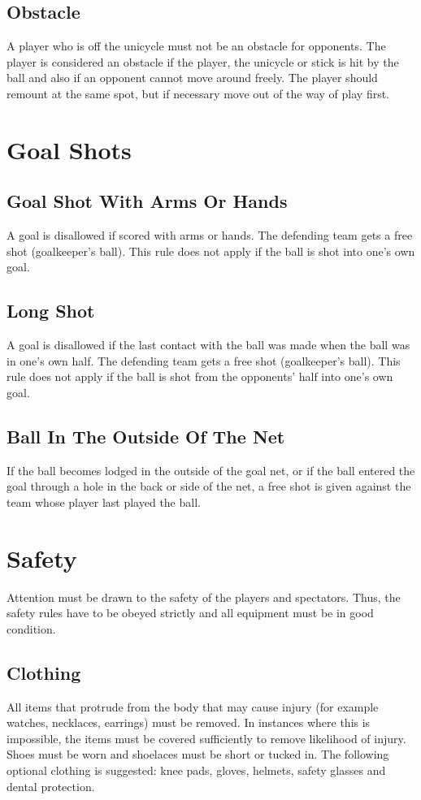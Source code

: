 \subsection{Obstacle}
A player who is off the unicycle must not be an obstacle for opponents.
The player is considered an obstacle if the player, the unicycle or stick is hit by the ball and also if an opponent cannot move around freely.
The player should remount at the same spot, but if necessary move out of the way of play first.

\section{Goal Shots}

\subsection{Goal Shot With Arms Or Hands \label{subsec:hockey_goal-shots_with-arms-or-hands}}
A goal is disallowed if scored with arms or hands.
The defending team gets a free shot (goalkeeper's ball).
This rule does not apply if the ball is shot into one's own goal.

\subsection{Long Shot}
A goal is disallowed if the last contact with the ball was made when the ball was in one's own half.
The defending team gets a free shot (goalkeeper's ball).
This rule does not apply if the ball is shot from the opponents' half into one's
own goal.

\subsection{Ball In The Outside Of The Net}
If the ball becomes lodged in the outside of the goal net, or if the ball entered the goal through a hole in the back or side of the net, a free shot is given against the team whose player last played the ball.

\section{Safety}

Attention must be drawn to the safety of the players and spectators.
Thus, the safety rules have to be obeyed strictly and all equipment must be in good condition.

\subsection{Clothing \label{subsec:hockey_safety_clothing}}
All items that protrude from the body that may cause injury (for example watches, necklaces, earrings) must be removed.
In instances where this is impossible, the items must be covered sufficiently to remove likelihood of injury.
Shoes must be worn and shoelaces must be short or tucked in.
The following optional clothing is suggested: knee pads, gloves, helmets, safety glasses and dental protection.

